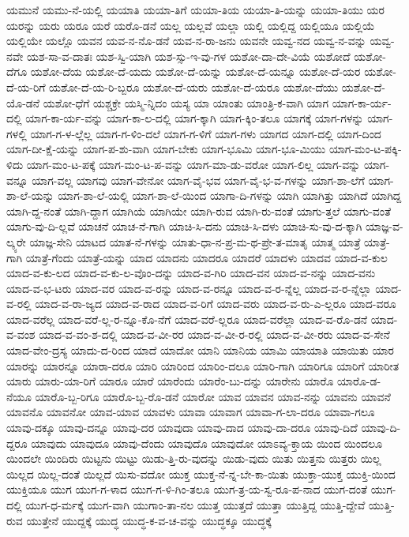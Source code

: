 {ಯಮುನೆ
ಯಮು-ನೆ-ಯಲ್ಲಿ
ಯಯಾತಿ
ಯಯಾ-ತಿಗೆ
ಯಯಾ-ತಿಯ
ಯಯಾ-ತಿ-ಯನ್ನು
ಯಯಾ-ತಿಯು
ಯರ
ಯರನ್ನು
ಯರು
ಯರೂ
ಯರೆ
ಯರೊ-ಡನೆ
ಯಲ್ಲ
ಯಲ್ಲವೆ
ಯಲ್ಲಾ
ಯಲ್ಲಿ
ಯಲ್ಲಿದ್ದ
ಯಲ್ಲಿಯೂ
ಯಲ್ಲಿಯೆ
ಯಲ್ಲಿಯೇ
ಯಲ್ಲೊ
ಯವನ
ಯವ-ನ-ನೊ-ಡನೆ
ಯವ-ನ-ರಾ-ಜನು
ಯವನೇ
ಯವ್ವ-ನದ
ಯವ್ವ-ನ-ವನ್ನು
ಯವ್ವ-ನವೇ
ಯಶ-ಸಾ-ವ-ದಾತಃ
ಯಶ-ಸ್ವಿ-ಯಾಗಿ
ಯಶ-ಸ್ಸು-ಇ-ವು-ಗಳ
ಯಶೋ-ದಾ-ದೇ-ವಿಯೆ
ಯಶೋದೆ
ಯಶೋ-ದೆಗೂ
ಯಶೋ-ದೆಯ
ಯಶೋ-ದೆ-ಯದು
ಯಶೋ-ದೆ-ಯನ್ನು
ಯಶೋ-ದೆ-ಯನ್ನೂ
ಯಶೋ-ದೆ-ಯರ
ಯಶೋ-ದೆ-ಯ-ರಿಗೆ
ಯಶೋ-ದೆ-ಯ-ರಿ-ಬ್ಬರೂ
ಯಶೋ-ದೆ-ಯರು
ಯಶೋ-ದೆ-ಯರೂ
ಯಶೋ-ದೆಯು
ಯಶೋ-ದೆ-ಯೊ-ಡನೆ
ಯಶೋ-ಧೆಗೆ
ಯಶ್ಚಕ್ರೇ
ಯಸ್ಮಿ-ನ್ನಿದಂ
ಯಸ್ಯ
ಯಾ
ಯಾಂತು
ಯಾಂತ್ರಿ-ಕ-ವಾಗಿ
ಯಾಗ
ಯಾಗ-ಕಾ-ರ್ಯ-ದಲ್ಲಿ
ಯಾಗ-ಕಾ-ರ್ಯ-ವನ್ನು
ಯಾಗ-ಕಾ-ಲ-ದಲ್ಲಿ
ಯಾಗ-ಕ್ಕಾಗಿ
ಯಾಗ-ಕ್ಕಿಂ-ತಲೂ
ಯಾಗಕ್ಕೆ
ಯಾಗ-ಗಳನ್ನು
ಯಾಗ-ಗಳಲ್ಲಿ
ಯಾಗ-ಗ-ಳ-ಲ್ಲೆಲ್ಲ
ಯಾಗ-ಗ-ಳಿಂ-ದಲೆ
ಯಾಗ-ಗ-ಳಿಗೆ
ಯಾಗ-ಗಳು
ಯಾಗದ
ಯಾಗ-ದಲ್ಲಿ
ಯಾಗ-ದಿಂದ
ಯಾಗ-ದೀ-ಕ್ಷೆ-ಯನ್ನು
ಯಾಗ-ಪ-ಶು-ವಾಗಿ
ಯಾಗ-ಬೇಕು
ಯಾಗ-ಭೂಮಿ
ಯಾಗ-ಭೂ-ಮಿಯು
ಯಾಗ-ಮಂ-ಟ-ಪಕ್ಕಿ-ಳಿದು
ಯಾಗ-ಮಂ-ಟ-ಪಕ್ಕೆ
ಯಾಗ-ಮಂ-ಟ-ಪ-ವನ್ನು
ಯಾಗ-ಮಾ-ಡು-ವರೋ
ಯಾಗ-ಲಿಲ್ಲ
ಯಾಗ-ವನ್ನು
ಯಾಗ-ವನ್ನೂ
ಯಾಗ-ವಲ್ಲ
ಯಾಗವು
ಯಾಗ-ವೇನೋ
ಯಾಗ-ವೈ-ಭವ
ಯಾಗ-ವೈ-ಭ-ವ-ಗಳನ್ನು
ಯಾಗ-ಶಾ-ಲೆಗೆ
ಯಾಗ-ಶಾ-ಲೆ-ಯನ್ನು
ಯಾಗ-ಶಾ-ಲೆ-ಯಲ್ಲಿ
ಯಾಗ-ಶಾ-ಲೆ-ಯಿಂದ
ಯಾಗಾ-ದಿ-ಗಳನ್ನು
ಯಾಗಿ
ಯಾಗಿತ್ತು
ಯಾಗಿದೆ
ಯಾಗಿದ್ದ
ಯಾಗಿ-ದ್ದ-ನಂತೆ
ಯಾಗಿ-ದ್ದಾಗ
ಯಾಗಿಯೆ
ಯಾಗಿಯೇ
ಯಾಗಿ-ರುವ
ಯಾಗಿ-ರು-ವಂತೆ
ಯಾಗು-ತ್ತಲೆ
ಯಾಗು-ವಂತೆ
ಯಾಗು-ವು-ದಿ-ಲ್ಲವೆ
ಯಾಚನೆ
ಯಾಚ-ನೆ-ಗಾಗಿ
ಯಾಚಿ-ಸಿ-ದನು
ಯಾಚಿ-ಸಿ-ದಳು
ಯಾಚಿ-ಸು-ವು-ದ-ಕ್ಕಾಗಿ
ಯಾಜ್ಞ-ವ-ಲ್ಕ್ಯರೇ
ಯಾಜ್ಞ-ಸೇನಿ
ಯಾಟದ
ಯಾತ-ನೆ-ಗಳನ್ನು
ಯಾತು-ಧಾ-ನ-ಪ್ರ-ಮ-ಥ-ಪ್ರೇ-ತ-ಮಾತೃ
ಯಾತ್ಮ
ಯಾತ್ರೆ
ಯಾತ್ರೆ-ಗಾಗಿ
ಯಾತ್ರೆ-ಗೆಂದು
ಯಾತ್ರೆ-ಯನ್ನು
ಯಾದ
ಯಾದನು
ಯಾದರೂ
ಯಾದರೆ
ಯಾದಳು
ಯಾದವ
ಯಾದ-ವ-ಕುಲ
ಯಾದ-ವ-ಕು-ಲದ
ಯಾದ-ವ-ಕು-ಲ-ವೊಂ-ದನ್ನು
ಯಾದ-ವ-ಗಿರಿ
ಯಾದ-ವನ
ಯಾದ-ವ-ನನ್ನು
ಯಾದ-ವನು
ಯಾದ-ವ-ಭ-ಟರು
ಯಾದ-ವರ
ಯಾದ-ವ-ರನ್ನು
ಯಾದ-ವ-ರನ್ನೂ
ಯಾದ-ವ-ರ-ನ್ನೆಲ್ಲ
ಯಾದ-ವ-ರ-ನ್ನೆಲ್ಲಾ
ಯಾದ-ವ-ರಲ್ಲಿ
ಯಾದ-ವ-ರಾ-ಜ್ಯದ
ಯಾದ-ವ-ರಾದ
ಯಾದ-ವ-ರಿಗೆ
ಯಾದ-ವರು
ಯಾದ-ವ-ರು-ಎ-ಲ್ಲರೂ
ಯಾದ-ವರೂ
ಯಾದ-ವರೆಲ್ಲ
ಯಾದ-ವರೆ-ಲ್ಲ-ರ-ನ್ನೂ-ಕೊ-ನೆಗೆ
ಯಾದ-ವರೆ-ಲ್ಲರೂ
ಯಾದ-ವರೆಲ್ಲಾ
ಯಾದ-ವ-ರೊ-ಡನೆ
ಯಾದ-ವ-ವಂಶ
ಯಾದ-ವ-ವಂ-ಶ-ದಲ್ಲಿ
ಯಾದ-ವ-ವೀ-ರರ
ಯಾದ-ವ-ವೀ-ರ-ರಲ್ಲಿ
ಯಾದ-ವ-ವೀ-ರರು
ಯಾದ-ವ-ಸೇನೆ
ಯಾದ-ವೇಂ-ದ್ರಸ್ಯ
ಯಾದು-ದ-ರಿಂದ
ಯಾದೆ
ಯಾದೋ
ಯಾನಿ
ಯಾನಿಯ
ಯಾಮಿ
ಯಾಯಾತಿ
ಯಾಯಿತು
ಯಾರ
ಯಾರನ್ನು
ಯಾರನ್ನೂ
ಯಾರಾ-ದರೂ
ಯಾರಿ
ಯಾರಿಂದ
ಯಾರಿಂ-ದಲೂ
ಯಾರಿ-ಗಾಗಿ
ಯಾರಿಗೂ
ಯಾರಿಗೆ
ಯಾರೀತ
ಯಾರು
ಯಾರು-ಯಾ-ರಿಗೆ
ಯಾರೂ
ಯಾರೆ
ಯಾರೆಂದು
ಯಾರೆಂ-ಬು-ದನ್ನು
ಯಾರೇನು
ಯಾರೊ
ಯಾರೊ-ಡ-ನೆಯೂ
ಯಾರೊ-ಬ್ಬ-ರಿಗೂ
ಯಾರೊ-ಬ್ಬ-ರೊ-ಡನೆ
ಯಾರೋ
ಯಾವ
ಯಾವನ
ಯಾವ-ನನ್ನು
ಯಾವನು
ಯಾವನೆ
ಯಾವನೊ
ಯಾವನೋ
ಯಾವ-ಯಾವ
ಯಾವಳು
ಯಾವಾ
ಯಾವಾಗ
ಯಾವಾ-ಗ-ಲಾ-ದರೂ
ಯಾವಾ-ಗಲೂ
ಯಾವು-ದಕ್ಕೂ
ಯಾವು-ದನ್ನೂ
ಯಾವು-ದರ
ಯಾವುದಾ
ಯಾವು-ದಾದ
ಯಾವು-ದಾ-ದರೂ
ಯಾವು-ದಿದೆ
ಯಾವು-ದಿ-ದ್ದರೂ
ಯಾವುದು
ಯಾವುದೂ
ಯಾವು-ದೆಂದು
ಯಾವುದೊ
ಯಾವುದೋ
ಯಾಽವ್ಯ-ಕ್ತಾಯ
ಯಿಂದ
ಯಿಂದಲೂ
ಯಿಂದಲೇ
ಯಿಂದಿರು
ಯಿಟ್ಟನು
ಯಿಟ್ಟು
ಯಿಡು-ತ್ತಿ-ರು-ವುದನ್ನು
ಯಿಡು-ವುದು
ಯಿತು
ಯಿತ್ತನು
ಯಿತ್ತರು
ಯಿಲ್ಲ
ಯಿಲ್ಲದ
ಯಿಲ್ಲ-ದಂತೆ
ಯಿಲ್ಲದೆ
ಯಿಸು-ವದೋ
ಯುಕ್ತ
ಯುಕ್ತ-ನೆ-ನ್ನ-ಬೇ-ಕಾ-ಯಿತು
ಯುಕ್ತಾ-ಯುಕ್ತ
ಯುಕ್ತಿ-ಯಿಂದ
ಯುಕ್ತಿಯೂ
ಯುಗ
ಯುಗ-ಗ-ಳಾದ
ಯುಗ-ಗ-ಳಿ-ಗಿಂ-ತಲೂ
ಯುಗ-ತ್ರ-ಯ-ಸ್ವ-ರೂ-ಪ-ನಾದ
ಯುಗ-ದಂತೆ
ಯುಗ-ದಲ್ಲಿ
ಯುಗ-ಧ-ರ್ಮಕ್ಕೆ
ಯುಗ-ವಾಗಿ
ಯುಗಾಂ-ತಾ-ನಲ
ಯುತ್ತ
ಯುತ್ತದೆ
ಯುತ್ತಾ
ಯುತ್ತಿದ್ದ
ಯುತ್ತಿ-ದ್ದೇವೆ
ಯುತ್ತಿ-ರುವ
ಯುತ್ತೇನೆ
ಯುದ್ದಕ್ಕೆ
ಯುದ್ಧ
ಯುದ್ಧ-ಕ-ವ-ಚ-ವನ್ನು
ಯುದ್ಧಕ್ಕೂ
ಯುದ್ಧಕ್ಕೆ
}
